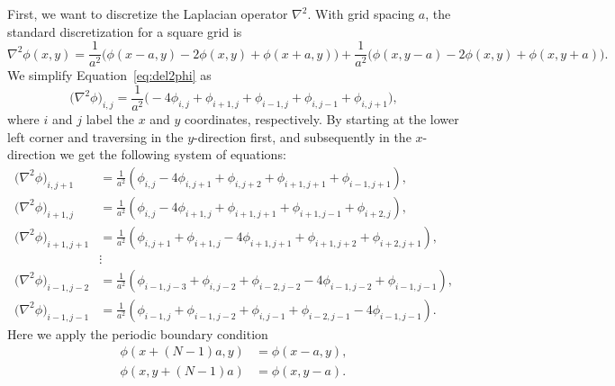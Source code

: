 \Answer{}
% 

First, we want to discretize the Laplacian operator \(\nabla^2\).
With grid spacing \(a\), the standard discretization for a square grid is
%
\begin{equation}\label{eq:del2phi}
    \nabla^2 \phi(x, y) =
    \frac{ 1 }{ a^2 } \bigl(\phi(x - a, y) - 2 \phi(x, y) + \phi(x + a, y)\bigr) +
    \frac{ 1 }{ a^2 } \bigl(\phi(x, y - a) - 2 \phi(x, y) + \phi(x, y + a)\bigr).
\end{equation}
%
We simplify Equation~\eqref{eq:del2phi} as
%
\begin{equation}
    \bigl(\nabla^2 \phi\bigr)_{i, j} = \frac{1}{a^2} \bigl(
    -4 \phi_{i, j} + \phi_{i+1, j} + \phi_{i-1, j} + \phi_{i, j-1} + \phi_{i, j+1}
    \bigr),
\end{equation}
%
where \(i\) and \(j\) label the \(x\) and \(y\) coordinates, respectively.
By starting at the lower left corner and traversing in the \(y\)-direction first, and
subsequently in the \(x\)-direction we get the following system of equations:
%
\begin{align}
    \bigl(\nabla^2 \phi\bigr)_{i, j+1}   & = \frac{1}{a^2} (
    \phi_{i, j} - 4\phi_{i, j+1} + \phi_{i, j+2} + \phi_{i+1, j+1} + \phi_{i-1, j+1}
    ),                                                       \\
    \bigl(\nabla^2 \phi\bigr)_{i+1, j}   & = \frac{1}{a^2} (
    \phi_{i, j} - 4\phi_{i+1, j} + \phi_{i+1, j+1} + \phi_{i+1, j-1} + \phi_{i+2, j}
    ),                                                       \\
    \bigl(\nabla^2 \phi\bigr)_{i+1, j+1} & = \frac{1}{a^2} (
    \phi_{i, j+1} + \phi_{i+1, j} - 4\phi_{i+1, j+1} + \phi_{i+1, j+2} + \phi_{i+2, j+1}
    ),                                                       \\
                                         & \vdots            \\
    \bigl(\nabla^2 \phi\bigr)_{i-1, j-2} & = \frac{1}{a^2} (
    \phi_{i-1, j-3} + \phi_{i, j-2} + \phi_{i-2, j-2} - 4\phi_{i-1, j-2} + \phi_{i-1, j-1}
    ),                                                       \\
    \bigl(\nabla^2 \phi\bigr)_{i-1, j-1} & = \frac{1}{a^2} (
    \phi_{i-1, j} + \phi_{i-1, j-2} + \phi_{i, j-1} + \phi_{i-2, j-1} - 4\phi_{i-1, j-1}
    ).
\end{align}
%
Here we apply the periodic boundary condition
%
\begin{align}
    \phi(x + (N-1)a, y) & = \phi(x - a, y), \\
    \phi(x, y + (N-1)a) & = \phi(x, y - a).
\end{align}

